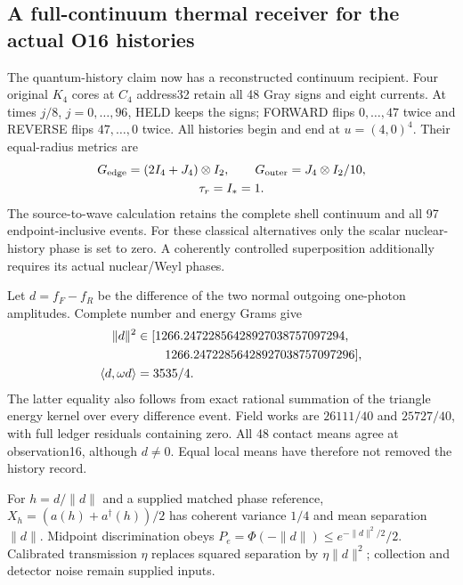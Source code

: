 \subsection{A full-continuum thermal receiver for the actual O16 histories}
\label{sec:thermal-receiver-12}

The quantum-history claim now has a reconstructed continuum recipient.
Four original $K_4$ cores at $C_4$ address32 retain all 48 Gray signs and
eight currents. At times $j/8$, $j=0,\ldots,96$, HELD keeps the signs;
FORWARD flips $0,\ldots,47$ twice and REVERSE flips $47,\ldots,0$ twice.
All histories begin and end at $u=(4,0)^4$. Their equal-radius metrics are
\begin{equation}
\begin{gathered}
 G_{\rm edge}=(2I_4+J_4)\otimes I_2,\qquad
 G_{\rm outer}=J_4\otimes I_2/10,\\
 \tau_r=I_*=1.
\end{gathered}
\end{equation}
The source-to-wave calculation retains the complete shell continuum and
all 97 endpoint-inclusive events. For these classical alternatives only
the scalar nuclear-history phase is set to zero. A coherently controlled
superposition additionally requires its actual nuclear/Weyl phases.

Let $d=f_F-f_R$ be the difference of the two normal outgoing one-photon
amplitudes. Complete number and energy Grams give
\begin{align}
 \|d\|^2&\in[1266.24722856428927038757097294,\notag\\
 &\hspace{2.3em}1266.24722856428927038757097296],\\
 \langle d,\omega d\rangle&=3535/4.
\end{align}
The latter equality also follows from exact rational summation of the
triangle energy kernel over every difference event. Field works are
$26111/40$ and $25727/40$, with full ledger residuals containing zero.
All 48 contact means agree at observation16, although $d\ne0$.
Equal local means have therefore not removed the history record.

For $h=d/\|d\|$ and a supplied matched phase reference,
$X_h=(a(h)+a^\dagger(h))/2$ has coherent variance $1/4$ and mean
separation $\|d\|$. Midpoint discrimination obeys
$P_e=\Phi(-\|d\|)\le e^{-\|d\|^2/2}/2$.
Calibrated transmission $\eta$ replaces squared separation by
$\eta\|d\|^2$; collection and detector noise remain supplied inputs.

